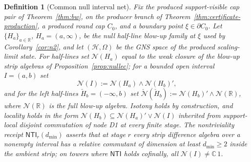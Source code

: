 \documentclass[11pt]{article}
\newtheorem{definition}[theorem]{Definition}
\begin{document}
\begin{definition}[Common null interval net]
\label{def:common-null-gns-net}
Fix the produced support-visible cap pair of Theorem~\ref{thm:bw}, on the
producer branch of Theorem~\ref{thm:certificate-production}, a produced round
cap \(C_0\), and a boundary point \(\xi\in\partial C_0\). Let
\(\{H_a\}_{a\in\mathbb R}\), \(H_a=(a,\infty)\), be the null half-line
blow-up family at \(\xi\) used by Corollary~\ref{cor:n2}, and let
\((\mathcal H,\Omega)\) be the GNS space of the produced scaling-limit state.
For half-lines set \(\mathcal N(H_a)\) equal to the weak closure of the
blow-up strip algebras of Proposition~\ref{prop:nullec}; for a bounded open
interval \(I=(a,b)\) set
\[
\mathcal N(I):=\mathcal N(H_a)\wedge \mathcal N(H_b)',
\]
and for the left half-lines \(\check H_b=(-\infty,b)\) set
\(\check{\mathcal N}(\check H_b):=\mathcal N(H_b)'\wedge\mathcal N(\mathbb R)\),
where \(\mathcal N(\mathbb R)\) is the full blow-up algebra. Isotony holds by
construction, and locality holds in the form
\(\mathcal N(H_b)\subseteq\mathcal N(H_a)'\vee\mathcal N(I)\) inherited from
support-local disjoint commutation of node D1 at every finite stage. The
\emph{nontriviality receipt} \(\mathsf{NTI}_r(d_{\min})\) asserts that at stage
\(r\) every strip difference algebra over a nonempty interval has a
relative commutant of dimension at least \(d_{\min}\geq2\) inside the ambient
strip; on towers where \(\mathsf{NTI}\) holds cofinally, all
\(\mathcal N(I)\neq\mathbb C\,1\).
\end{definition}
\end{document}
